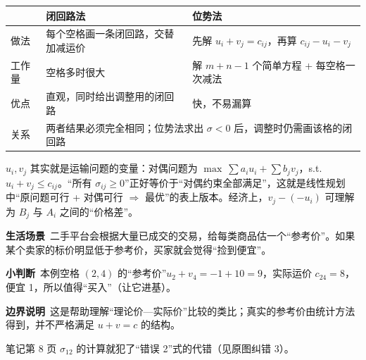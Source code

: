 \begin{center}\small
\begin{tabularx}{\linewidth}{@{}lXX@{}}
\toprule
 & 闭回路法 & 位势法\\
\midrule
做法 & 每个空格画一条闭回路，交替加减运价 & 先解 $u_i+v_j=c_{ij}$，再算 $c_{ij}-u_i-v_j$\\
工作量 & 空格多时很大 & 解 $m+n-1$ 个简单方程 + 每空格一次减法\\
优点 & 直观，同时给出调整用的闭回路 & 快，不易漏算\\
关系 & \multicolumn{2}{l}{两者结果必须完全相同；位势法求出 $\sigma<0$ 后，调整时仍需画该格的闭回路}\\
\bottomrule
\end{tabularx}
\end{center}

\begin{extbox}
$u_i,v_j$ 其实就是运输问题的变量：对偶问题为 $\max\ \sum a_iu_i+\sum b_jv_j$，s.t.\ $u_i+v_j\le c_{ij}$。“所有 $\sigma_{ij}\ge0$”正好等价于“对偶约束全部满足”，这就是线性规划中“原问题可行 + 对偶可行 $\Rightarrow$ 最优”的表上版本。经济上，$v_j-(-u_i)$ 可理解为 $B_j$ 与 $A_i$ 之间的“价格差”。
\end{extbox}

\begin{lifebox}
\textbf{生活场景}\ 二手平台会根据大量已成交的交易，给每类商品估一个“参考价”。如果某个卖家的标价明显低于参考价，买家就会觉得“捡到便宜”。\par
{}
\textbf{小判断}\ 本例空格 $(2,4)$ 的“参考价”$u_2+v_4=-1+10=9$，实际运价 $c_{24}=8$，便宜 1，所以值得“买入”（让它进基）。\par
\textbf{边界说明}\ 这是帮助理解“理论价—实际价”比较的类比；真实的参考价由统计方法得到，并不严格满足 $u+v=c$ 的结构。
\end{lifebox}

\begin{warningbox}[位势法中最常见的三个错误]
\begin{center}
\end{center}
笔记第 8 页 $\sigma_{12}$ 的计算就犯了“错误 2”式的代错（见原图纠错 3）。
\end{warningbox}

